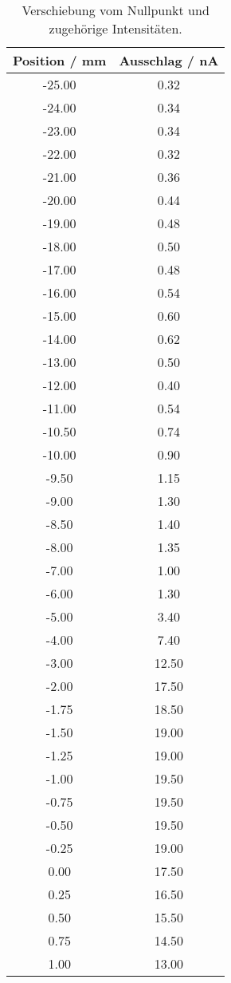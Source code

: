 \begin{table}[!htp]
\centering
\caption{Verschiebung vom Nullpunkt und zugehörige Intensitäten.}
\label{tab:spalt1}
\begin{tabular}{c c}
\toprule
{{Position / mm}} & {{Ausschlag / nA}} \\
\midrule
-25.00   & 0.32 \\
-24.00   & 0.34 \\
-23.00   & 0.34 \\
-22.00   & 0.32 \\
-21.00   & 0.36 \\
-20.00   & 0.44 \\
-19.00   & 0.48 \\
-18.00   & 0.50 \\
-17.00   & 0.48 \\
-16.00   & 0.54 \\
-15.00   & 0.60 \\
-14.00   & 0.62 \\
-13.00   & 0.50 \\
-12.00   & 0.40 \\
-11.00   & 0.54 \\
-10.50   & 0.74 \\
-10.00   & 0.90 \\
-9.50    & 1.15 \\
-9.00    & 1.30 \\
-8.50    & 1.40 \\
-8.00    & 1.35 \\
-7.00    & 1.00 \\
-6.00    & 1.30 \\
-5.00    & 3.40 \\
-4.00    & 7.40 \\
-3.00    & 12.50 \\
-2.00    & 17.50 \\
-1.75    & 18.50 \\
-1.50    & 19.00 \\
-1.25    & 19.00 \\
-1.00    & 19.50 \\
-0.75    & 19.50 \\
-0.50    & 19.50 \\
-0.25    & 19.00 \\
 0.00    & 17.50 \\
 0.25    & 16.50 \\
 0.50    & 15.50 \\
 0.75    & 14.50 \\
 1.00    & 13.00 \\

\end{tabular}
\end{table}
